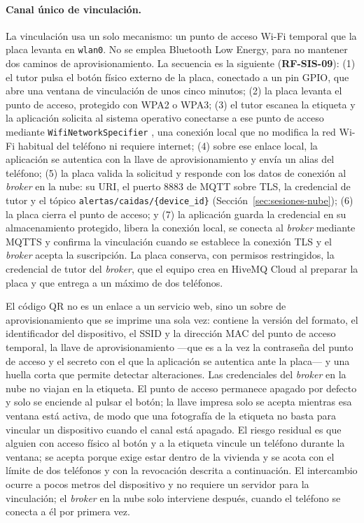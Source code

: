 \documentclass[12pt,a4paper,oneside]{book}
\theoremstyle{plain}
\theoremstyle{definition}
\theoremstyle{remark}
\begin{document}
\paragraph{Canal único de vinculación.} La vinculación usa un solo mecanismo: un punto de acceso Wi-Fi temporal que la placa levanta en \texttt{wlan0}. No se emplea Bluetooth Low Energy, para no mantener dos caminos de aprovisionamiento. La secuencia es la siguiente (\textbf{RF-SIS-09}): (1) el tutor pulsa el botón físico externo de la placa, conectado a un pin GPIO, que abre una ventana de vinculación de unos cinco minutos; (2) la placa levanta el punto de acceso, protegido con WPA2 o WPA3; (3) el tutor escanea la etiqueta y la aplicación solicita al sistema operativo conectarse a ese punto de acceso mediante \texttt{WifiNetworkSpecifier} \parencite{android2026wifispecifier}, una conexión local que no modifica la red Wi-Fi habitual del teléfono ni requiere internet; (4) sobre ese enlace local, la aplicación se autentica con la llave de aprovisionamiento y envía un alias del teléfono; (5) la placa valida la solicitud y responde con los datos de conexión al \textit{broker} en la nube: su URI, el puerto 8883 de MQTT sobre TLS, la credencial de tutor y el tópico \texttt{alertas/caidas/\{device\_id\}} (Sección~\ref{sec:sesiones-nube}); (6) la placa cierra el punto de acceso; y (7) la aplicación guarda la credencial en su almacenamiento protegido, libera la conexión local, se conecta al \textit{broker} mediante MQTTS y confirma la vinculación cuando se establece la conexión TLS y el \textit{broker} acepta la suscripción. La placa conserva, con permisos restringidos, la credencial de tutor del \textit{broker}, que el equipo crea en HiveMQ Cloud al preparar la placa y que entrega a un máximo de dos teléfonos.

El código QR no es un enlace a un servicio web, sino un sobre de aprovisionamiento que se imprime una sola vez: contiene la versión del formato, el identificador del dispositivo, el SSID y la dirección MAC del punto de acceso temporal, la llave de aprovisionamiento —que es a la vez la contraseña del punto de acceso y el secreto con el que la aplicación se autentica ante la placa— y una huella corta que permite detectar alteraciones. Las credenciales del \textit{broker} en la nube no viajan en la etiqueta. El punto de acceso permanece apagado por defecto y solo se enciende al pulsar el botón; la llave impresa solo se acepta mientras esa ventana está activa, de modo que una fotografía de la etiqueta no basta para vincular un dispositivo cuando el canal está apagado. El riesgo residual es que alguien con acceso físico al botón y a la etiqueta vincule un teléfono durante la ventana; se acepta porque exige estar dentro de la vivienda y se acota con el límite de dos teléfonos y con la revocación descrita a continuación. El intercambio ocurre a pocos metros del dispositivo y no requiere un servidor para la vinculación; el \textit{broker} en la nube solo interviene después, cuando el teléfono se conecta a él por primera vez.
\end{document}
